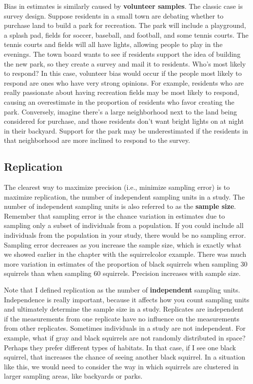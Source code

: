\documentclass[
]{book}
\begin{document}
Bias in estimates is similarly caused by \textbf{volunteer samples}. The classic case is survey design. Suppose residents in a small town are debating whether to purchase land to build a park for recreation. The park will include a playground, a splash pad, fields for soccer, baseball, and football, and some tennis courts. The tennis courts and fields will all have lights, allowing people to play in the evenings. The town board wants to see if residents support the idea of building the new park, so they create a survey and mail it to residents. Who's most likely to respond? In this case, volunteer bias would occur if the people most likely to respond are ones who have very strong opinions. For example, residents who are really passionate about having recreation fields may be most likely to respond, causing an overestimate in the proportion of residents who favor creating the park. Conversely, imagine there's a large neighborhood next to the land being considered for purchase, and those residents don't want bright lights on at night in their backyard. Support for the park may be underestimated if the residents in that neighborhood are more inclined to respond to the survey.

\subsection{Replication}\label{replication}

The clearest way to maximize precision (i.e., minimize sampling error) is to maximize replication, the number of independent sampling units in a study. The number of independent sampling units is also referred to as the \textbf{sample size}. Remember that sampling error is the chance variation in estimates due to sampling only a subset of individuals from a population. If you could include all individuals from the population in your study, there would be no sampling error. Sampling error decreases as you increase the sample size, which is exactly what we showed earlier in the chapter with the squirrelcolor example. There was much more variation in estimates of the proportion of black squirrels when sampling 30 squirrels than when sampling 60 squirrels. Precision increases with sample size.

Note that I defined replication as the number of \textbf{independent} sampling units. Independence is really important, because it affects how you count sampling units and ultimately determine the sample size in a study. Replicates are independent if the measurements from one replicate have no influence on the measurements from other replicates. Sometimes individuals in a study are not independent. For example, what if gray and black squirrels are not randomly distributed in space? Perhaps they prefer different types of habitats. In that case, if I see one black squirrel, that increases the chance of seeing another black squirrel. In a situation like this, we would need to consider the way in which squirrels are clustered in larger sampling areas, like backyards or parks.
\end{document}
